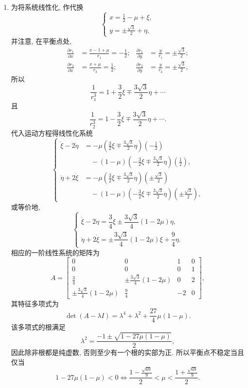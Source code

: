 \begin{description}[font=\normalfont,leftmargin=2em,labelwidth=1.5em]
\begin{enumerate}[label=(\alph*),ref=\alph*,leftmargin=*]
若 $y=0$, 则平衡点由函数
\[
  U(x)=\frac12x^2+\frac{\mu}{|x+1-\mu|}+\frac{1-\mu}{|x+\mu|}
\]
的临界点给出. 由于
\[
  U''(x)=1+\frac{2\mu}{|x+1-\mu|^3}+\frac{2(1-\mu)}{|x+\mu|^3}>0,
\]
且
\[
  \lim_{x\to\pm\infty}U(x)=\lim_{x\to\mu}U(x)=\lim_{x\to\mu-1}U(x)=+\infty,
\]
可知 $U$ 恰有三个临界点, 它们是局部极小点, 分别位于区间 $(-\infty,1-\mu)$, $(1-\mu,\mu)$ 和 $(\mu,+\infty)$ 中.
\item 为将系统线性化, 作代换
\[
  \begin{cases}
    x=\frac12-\mu+\xi,\\[2pt]
    y=\pm\frac{\sqrt3}{2}+\eta,
  \end{cases}
\]
并注意, 在平衡点处,
\begin{align*}
  \frac{\partial r_1}{\partial x}&=\frac{x-1+\mu}{r_1}=-\frac12;&
  \frac{\partial r_1}{\partial y}&=\frac y{r_1}=\pm\frac{\sqrt3}{2};\\
  \frac{\partial r_2}{\partial x}&=\frac{x+\mu}{r_2}=\frac12;&
  \frac{\partial r_2}{\partial y}&=\frac y{r_2}=\pm\frac{\sqrt3}{2},
\end{align*}
所以
\[
  \frac1{r_1^3}=1+\frac32\xi\mp\frac{3\sqrt3}{2}\eta+\cdots
\]
且
\[
  \frac1{r_2^3}=1-\frac32\xi\mp\frac{3\sqrt3}{2}\eta+\cdots.
\]
代入运动方程得线性化系统
\[
  \left\{\begin{aligned}
  \ddot\xi-2\dot\eta
   &=-\mu\left(\frac32\xi\mp\frac{3\sqrt3}{2}\eta\right)\left(-\frac12\right)\\
   &\quad-(1-\mu)\left(-\frac32\xi\mp\frac{3\sqrt3}{2}\eta\right)\left(\frac12\right),\\
  \ddot\eta+2\dot\xi
   &=-\mu\left(\frac32\xi\mp\frac{3\sqrt3}{2}\eta\right)\left(\pm\frac{\sqrt3}{2}\right)\\
   &\quad-(1-\mu)\left(-\frac32\xi\mp\frac{3\sqrt3}{2}\eta\right)\left(\pm\frac{\sqrt3}{2}\right),
  \end{aligned}\right.
\]
或等价地,
\[
  \begin{cases}
    \ddot\xi-2\dot\eta=\dfrac34\xi\pm\dfrac{3\sqrt3}{4}(1-2\mu)\eta,\\[4pt]
    \ddot\eta+2\dot\xi=\pm\dfrac{3\sqrt3}{4}(1-2\mu)\xi+\dfrac94\eta.
  \end{cases}
\]
相应的一阶线性系统的矩阵为
\[
  A=\begin{bmatrix}
   0&0&1&0\\
   0&0&0&1\\
   \frac34&\pm\frac{3\sqrt3}{4}(1-2\mu)&0&2\\
   \pm\frac{3\sqrt3}{4}(1-2\mu)&\frac94&-2&0
  \end{bmatrix},
\]
其特征多项式为
\[
  \det(A-\lambda I)=\lambda^4+\lambda^2+\frac{27}{4}\mu(1-\mu).
\]
该多项式的根满足
\[
  \lambda^2=\frac{-1\pm\sqrt{1-27\mu(1-\mu)}}{2},
\]
因此除非根都是纯虚数, 否则至少有一个根的实部为正. 所以平衡点不稳定当且仅当
\[
  1-27\mu(1-\mu)<0
   \iff\frac{1-\frac{\sqrt{69}}9}{2}<\mu<\frac{1+\frac{\sqrt{69}}9}{2}.
\]
\end{enumerate}


\end{description}
